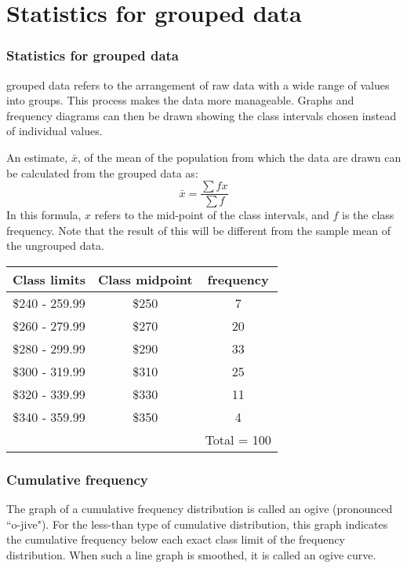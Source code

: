 \documentclass{beamer}
\begin{document}
\section*{Statistics for grouped data}

\begin{frame}
\frametitle{Statistics for grouped data}
grouped data refers to the arrangement of raw data with a wide range of values into groups. This process makes the data more manageable. Graphs and frequency diagrams can then be drawn showing the class intervals chosen instead of individual values.


\noindent An estimate, $\bar{x}$, of the mean of the population from which the data are drawn can be calculated from the grouped data as:
\[ \bar{x} = \frac{\sum f x }{\sum f}\]
In this formula, $x$ refers to the mid-point of the class intervals, and $f$ is the class frequency. Note that the result of this will be different from the sample mean of the ungrouped data.

\end{frame}
\begin{frame}
\begin{tabular}{|c|c|c|}
\hline
Class limits& Class midpoint & frequency \\
  \hline
\$240 - 259.99 & \$250 &7\\
\$260 - 279.99 & \$270 &20\\
\$280 - 299.99 & \$290 &33\\
\$300 - 319.99 & \$310 &25\\
\$320 - 339.99 & \$330 &11\\
\$340 - 359.99 & \$350 &4\\
\hline
& & Total = 100\\
  \hline
\end{tabular}
\end{frame}

\begin{frame}
\frametitle{Cumulative frequency}
The graph of a cumulative frequency distribution is called an ogive (pronounced ``o-jive"). For the less-than
type of cumulative distribution, this graph indicates the cumulative frequency below each exact class limit of
the frequency distribution. When such a line graph is smoothed, it is called an ogive curve.
\end{frame}
\end{document}
